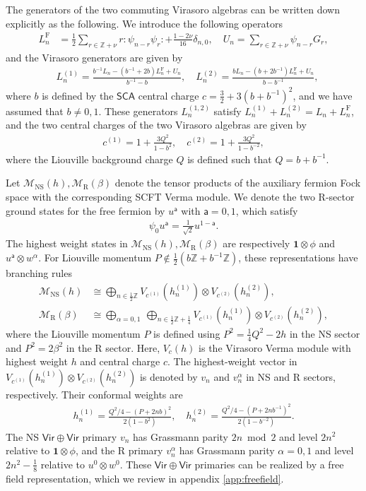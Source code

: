 \documentclass[12pt]{article}
\def\ie{\begin{equation}\begin{aligned}}
\def\fe{\end{aligned}\end{equation}}
\def\NS{\mathrm{NS}}
\def\R{\mathrm{R}}
\begin{document}
The generators of the two commuting Virasoro algebras can be written down explicitly as the following. We introduce the following operators
\ie
L_n^{\mathrm{F}} &= \frac{1}{2} \sum_{r\in \mathbb{Z}+\nu} r:\psi_{n-r}\psi_r: + \frac{1-2\nu}{16}\delta_{n,0},\quad U_n = \sum_{r\in \mathbb{Z}+\nu} \psi_{n-r} G_r,
\fe
and the Virasoro generators are given by
\ie
& L_n^{(1)}=\frac{b^{-1} L_n-\left(b^{-1}+2 b\right) L_n^{\mathrm{F}}+U_n}{b^{-1}-b}, \quad L_n^{(2)}=\frac{b L_n-\left(b+2 b^{-1}\right) L_n^{\mathrm{F}}+U_n}{b-b^{-1}},
\fe
where $b$ is defined by the $\mathsf{SCA}$ central charge $c= \frac{3}{2}+3\left(b+b^{-1}\right)^2$, and we have assumed that $b\neq 0,1$. These generators $L_n^{(1,2)}$ satisfy $L_n^{(1)}+L_n^{(2)}=L_n+L_n^{\mathrm{F}}$, and the two central charges of the two Virasoro algebras are given by
\ie
c^{(1)}=1+\frac{3 Q^2}{1-b^2}, \quad c^{(2)}=1+\frac{3 Q^2}{1-b^{-2}},
\fe
where the Liouville background charge $Q$ is defined such that $Q=b+b^{-1}$.

Let $\mathcal{M}_{\NS}(h), \mathcal{M}_{\R}(\beta)$ denote the tensor products of the auxiliary fermion Fock space with the corresponding SCFT Verma module. We denote the two R-sector ground states for the free fermion by $u^\mathsf{a}$ with $\mathsf{a}=0,1$, which satisfy
\ie
\psi_0 u^{\mathsf{a}} = \frac{1}{\sqrt{2}} u^{1-\mathsf{a}}.
\fe
The highest weight states in $\mathcal{M}_{\NS}(h), \mathcal{M}_{\R}(\beta)$ are respectively $\mathbf{1}\otimes \phi$ and $u^{\mathsf{a}}\otimes w^\alpha$. For Liouville momentum $P\notin \frac{1}{2}(b\mathbb{Z}+b^{-1}\mathbb{Z})$, these representations have branching rules \cite{Bershtein:2014yia,Bershtein:2016uov}
\ie
\mathcal{M}_{\NS}(h)&\cong\bigoplus_{n\in\frac12\mathbb Z} V_{c^{(1)}}(h_n^{(1)})\otimes V_{c^{(2)}}(h_n^{(2)}),\\
\mathcal{M}_{\R}(\beta)&\cong\bigoplus_{\alpha=0,1}\ \bigoplus_{n\in\frac12\mathbb Z+\frac14} V_{c^{(1)}}(h_n^{(1)})\otimes V_{c^{(2)}}(h_n^{(2)}),
\fe
where the Liouville momentum $P$ is defined using $P^2=\frac{1}{4}Q^2-2h$ in the NS sector and $P^2=2\beta^2$ in the R sector. Here, $V_c(h)$ is the Virasoro Verma module with highest weight $h$ and central charge $c$. The highest-weight vector in $V_{c^{(1)}}(h_n^{(1)})\otimes V_{c^{(2)}}(h_n^{(2)})$ is denoted by $v_n$ and $v_n^\alpha$ in NS and R sectors, respectively. Their conformal weights are
\ie
h_n^{(1)}=\frac{Q^2/4-(P+2nb)^2}{2(1-b^2)},\quad h_n^{(2)}=\frac{Q^2/4-(P+2nb^{-1})^2}{2(1-b^{-2})}.
\fe
The NS $\mathsf{Vir}\oplus \mathsf{Vir}$ primary $v_n$ has Grassmann parity $2n\bmod2$ and level $2n^2$ relative to $\mathbf{1}\otimes \phi$, and the R primary $v^\alpha_n$ has Grassmann parity $\alpha=0,1$ and level $2n^2-\frac18$ relative to $u^{0}\otimes w^0$. These $\mathsf{Vir\oplus Vir}$ primaries can be realized by a free field representation, which we review in appendix \ref{app:freefield}.
\end{document}

